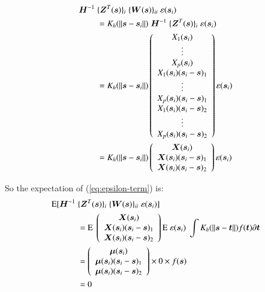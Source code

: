 \documentclass[authoryear, review, 11pt]{elsarticle}
\begin{document}
    \begin{align}\label{eq:epsilon-term}
      \bm{H}^{-1} \; &\{ \bm{Z}^T(\bm{s}) \}_i \; \{ \bm{W}(\bm{s}) \}_{ii} \; \varepsilon(\bm{s}_i) \notag \\
      &= K_h(\| \bm{s} - \bm{s}_i \|) \; \bm{H}^{-1} \; \{ \bm{Z}^T(\bm{s}) \}_i \; \varepsilon(\bm{s}_i) \notag \\
      &= K_h(\| \bm{s} - \bm{s}_i \|) \left( \begin{array}{c} X_1(\bm{s}_i) \\ \vdots \\ X_p(\bm{s}_i) \\ X_1(\bm{s}_i) (\bm{s}_i - \bm{s})_1 \\ \vdots \\ X_p(\bm{s}_i) (\bm{s}_i - \bm{s})_1 \\ X_1(\bm{s}_i) (\bm{s}_i - \bm{s})_2 \\ \vdots \\X_p(\bm{s}_i) (\bm{s}_i - \bm{s})_2 \end{array} \right) \varepsilon(\bm{s}_i) \notag \\
      &= K_h(\| \bm{s} - \bm{s}_i \|) \left( \begin{array}{c} \bm{X}(\bm{s}_i) \\ \bm{X}(\bm{s}_i) (\bm{s}_i - \bm{s})_1 \\ \bm{X}(\bm{s}_i) (\bm{s}_i - \bm{s})_2 \end{array} \right) \varepsilon(\bm{s}_i)
    \end{align}

    So the expectation of (\ref{eq:epsilon-term}) is:
    \begin{align}
      \text{E} [ \bm{H}^{-1} \; &\{ \bm{Z}^T(\bm{s}) \}_i \; \{ \bm{W}(\bm{s}) \}_{ii} \; \varepsilon(\bm{s}_i) ] \notag \\
      &= \text{E} \; \left( \begin{array}{c} \bm{X}(\bm{s}_i) \\ \bm{X}(\bm{s}_i) (\bm{s}_i - \bm{s})_1 \\ \bm{X}(\bm{s}_i) (\bm{s}_i - \bm{s})_2 \end{array} \right) \text{E} \; \varepsilon(\bm{s}_i) \; \int K_h(\| \bm{s} - \bm{t} \|) f(\bm{t}) \partial \bm{t} \notag \\
      &= \left( \begin{array}{c} \bm{\mu}(\bm{s}_i) \\ \bm{\mu}(\bm{s}_i) (\bm{s}_i - \bm{s})_1 \\ \bm{\mu}(\bm{s}_i) (\bm{s}_i - \bm{s})_2 \end{array} \right) \times 0 \times f(\bm{s}) \notag \\
      &= 0
    \end{align}
    
\end{document}
